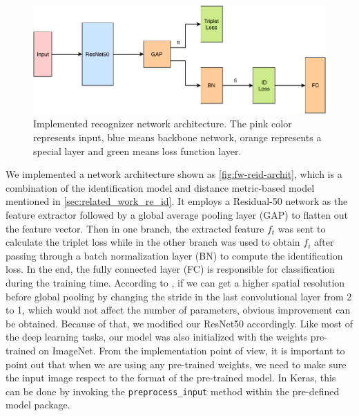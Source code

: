 \begin{figure}
    \includegraphics[width=\linewidth]{figures/framework_reid_archit.pdf}
    \caption[Implemented recognizer network architecture]
    {
        Implemented recognizer network architecture.
        The pink color represents input, blue means backbone network, orange
        represents a special layer and green means loss function layer.
    }
    \label{fig:fw-reid-archit}
\end{figure}

We implemented a network architecture shown as \autoref{fig:fw-reid-archit},
which is a combination of the identification model and distance metric-based
model mentioned in \autoref{sec:related_work_re_id}. It employs a Residual-50
network as the feature extractor followed by a global average pooling layer
(GAP) to flatten out the feature vector. Then in one branch, the extracted
feature $f_t$ was sent to calculate the triplet loss while in
the other branch was used to obtain $f_i$ after passing through a batch 
normalization layer (BN) to compute the identification loss. 
In the end, the fully connected
layer (FC) is responsible for classification during the training time.
According to \cite{pcb-and-rpp-for-reid},
if we can get a higher spatial resolution before global pooling by changing the
stride in the last convolutional layer from 2 to 1, which would not affect the
number of parameters, obvious improvement can be obtained. Because of that, we
modified our ResNet50 accordingly. Like most of the deep learning tasks, our
model was also initialized with the weights pre-trained on ImageNet.
From the implementation point of view, it is important
to point out that when we are using any pre-trained weights, we need to make
sure the input image respect to the format of the pre-trained model. In Keras,
this can be done by invoking the \texttt{preprocess\_input} method within the
pre-defined model package.

